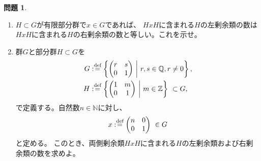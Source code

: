 \documentclass[uplatex]{jsreport}
\theoremstyle{definition}
\newtheorem{prob}[prob]{問題}
\newcommand{\dfn}{:\overset{\mbox{{\scriptsize def}}}{=}}
\newcommand{\Q}{\mathbb{Q}}
\newcommand{\Z}{\mathbb{Z}}
\newcommand{\N}{\mathbb{N}}
\begin{document}
\begin{prob}\label{1-3}
  \
  \begin{enumerate}
    \item \(H\subset G\)が有限部分群で\(x\in G\)であれば、
    \(HxH\)に含まれる\(H\)の左剰余類の数は
    \(HxH\)に含まれる\(H\)の右剰余類の数と等しい。これを示せ。
    \item \label{1-3-2}
    群\(G\)と部分群\(H\subset G\)を
    \begin{align*}
      G &\dfn \left\{
      \begin{pmatrix}
        r & s \\
        0 & 1 \\
      \end{pmatrix} \
      \middle| \ r,s\in \Q,r\neq 0
      \right\}, \\
      H &\dfn \left\{
      \begin{pmatrix}
        1 & m \\
        0 & 1 \\
      \end{pmatrix} \
      \middle| \ m\in \Z \right\} \ \subset G,
    \end{align*}
    で定義する。自然数\(n\in \N\)に対し、
    \[
    x\dfn
    \begin{pmatrix}
      n & 0 \\
      0 & 1 \\
    \end{pmatrix} \ \in G
    \]
    と定める。
    このとき、両側剰余類\(HxH\)に含まれる\(H\)の左剰余類および右剰余類の数を求めよ。
  \end{enumerate}
\end{prob}
\end{document}

